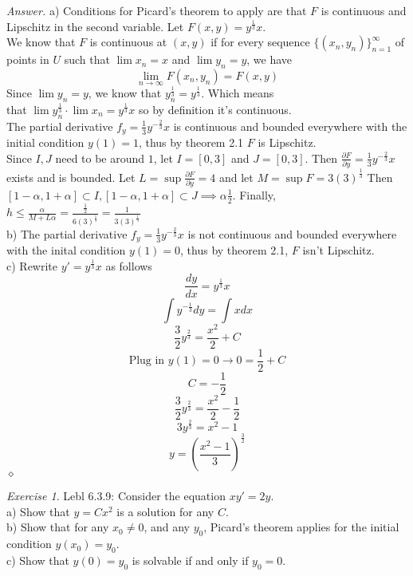 \documentclass[12pt,oneside]{amsart}
\theoremstyle{definition}
\theoremstyle{remark}
\newtheorem{exer}{Exercise}
\numberwithin{equation}{exer}
\newenvironment{answer}{\bigskip\noindent\emph{Answer.}}{\hfill$\diamond$\newline}
\begin{document}
\begin{answer}
a) Conditions for Picard's theorem to apply are that $F$ is continuous and Lipschitz in the second variable. Let $F(x,y)=y^\frac{1}{3}x$. \\
We know that $F$ is continuous at $(x,y)$ if for every sequence $\{(x_n,y_n)\}_{n=1}^{\infty}$ of points in $U$ such that $\lim x_n=x$ and $\lim y_n=y$, we have
$$\lim_{n\to\infty}F(x_n,y_n)=F(x,y)$$ 
Since $\lim y_n=y$, we know that $y_n^\frac{1}{3}=y^\frac{1}{3}$. Which  means \\ that $\lim y_n^{\frac{1}{3}}\cdot \lim x_n = y^\frac{1}{3}x$ so by definition it's continuous. \\
The partial derivative $f_y=\frac{1}{3}y^{-\frac{2}{3}}x$ is continuous and bounded everywhere with the initial condition $y(1)=1$, thus by theorem 2.1 $F$ is Lipschitz. \\
Since $I, J$ need to be around $1$, let $I=[0,3]$ and $J=[0,3]$. Then $\frac{\partial F}{\partial y}=\frac{1}{3}y^{-\frac{2}{3}}x$ exists and is bounded.  Let $L=\sup\frac{\partial F}{\partial y}=4$ and let $M=\sup F=3(3)^\frac{1}{3}$ Then $[1-\alpha,1+\alpha]\subset I,[1-\alpha,1+\alpha]\subset J\implies\alpha\frac{1}{2}$. Finally, $h\leq\frac{\alpha}{M+L\alpha}=\frac{\frac{1}{2}}{6(3)^\frac{1}{3}}=\frac{1}{3(3)^\frac{1}{3}}$ \\
b) The partial derivative $f_y=\frac{1}{3}y^{-\frac{2}{3}}x$ is not continuous and bounded everywhere with the inital condition $y(1)=0$, thus by theorem 2.1, $F$ isn't Lipschitz.  \\
c) Rewrite $y'=y^\frac{1}{3}x$ as follows
$$\frac{dy}{dx}=y^\frac{1}{3}x$$
$$\int y^{-\frac{1}{3}}dy=\int x dx$$
$$\frac{3}{2}y^\frac{2}{3}=\frac{x^2}{2}+C$$
$$\text{Plug in $y(1)=0$}\rightarrow0=\frac{1}{2}+C$$
$$C=-\frac{1}{2}$$
$$\frac{3}{2}y^\frac{2}{3}=\frac{x^2}{2}-\frac{1}{2}$$
$$3y^\frac{2}{3}=x^2-1$$
$$y=(\frac{x^2-1}{3})^\frac{3}{2}$$
\end{answer}

\newpage
\begin{exer}
Lebl 6.3.9: Consider the equation $xy'=2y$. \\
a) Show that $y=Cx^2$ is a solution for any $C$. \\
b) Show that for any $x_0\neq 0$, and any $y_0$, Picard's theorem applies for the initial condition $y(x_0)=y_0$. \\
c) Show that $y(0)=y_0$ is solvable if and only if $y_0=0$.
\end{exer}
\end{document}
